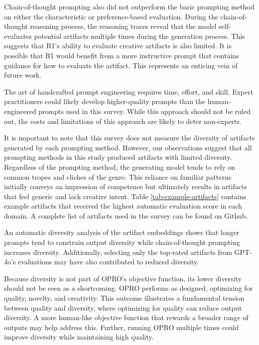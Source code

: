 \documentclass[phd,electronic,oneside,twosidetoc,letterpaper,chaptercenter,parttop,lof]{byumsphd}
\begin{document}
Chain-of-thought prompting also did not outperform the basic prompting method on either the characteristic or preference-based evaluation. During the chain-of-thought reasoning process, the reasoning traces reveal that the model self-evaluates potential artifacts multiple times during the generation process. This suggests that R1's ability to evaluate creative artifacts is also limited. It is possible that R1 would benefit from a more instructive prompt that contains guidance for how to evaluate the artifact. This represents an enticing vein of future work.

The art of handcrafted prompt engineering requires time, effort, and skill. Expert practitioners could likely develop higher-quality prompts than the human-engineered prompts used in this survey. While this approach should not be ruled out, the costs and limitations of this approach are likely to deter non-experts.

It is important to note that this survey does not measure the diversity of artifacts generated by each prompting method. However, our observations suggest that all prompting methods in this study produced artifacts with limited diversity. Regardless of the prompting method, the generating model tends to rely on common tropes and cliches of the genre. This reliance on familiar patterns initially conveys an impression of competence but ultimately results in artifacts that feel generic and lack creative intent. 
Table \ref{tab:example-artifacts} contains example artifacts that received the highest automatic evaluation score in each domain. A complete list of artifacts used in the survey can be found on Github.

An automatic diversity analysis of the artifact embeddings shows that longer prompts tend to constrain output diversity while chain-of-thought prompting increases diversity. Additionally, selecting only the top-rated artifacts from GPT-4o's evaluations may have also contributed to reduced diversity.

Because diversity is not part of OPRO's objective function, its lower diversity should not be seen as a shortcoming. OPRO performs as designed, optimizing for quality, novelty, and creativity. This outcome illustrates a fundamental tension between quality and diversity, where optimizing for quality can reduce output diversity. A more human-like objective function that rewards a broader range of outputs may help address this. Further, running OPRO multiple times could improve diversity while maintaining high quality.
\end{document}
